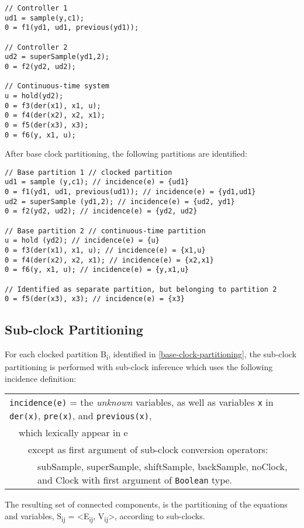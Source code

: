 \begin{example}
\begin{lstlisting}[language=modelica]
// Controller 1
ud1 = sample(y,c1);
0 = f1(yd1, ud1, previous(yd1));

// Controller 2
ud2 = superSample(yd1,2);
0 = f2(yd2, ud2);

// Continuous-time system
u = hold(yd2);
0 = f3(der(x1), x1, u);
0 = f4(der(x2), x2, x1);
0 = f5(der(x3), x3);
0 = f6(y, x1, u);
\end{lstlisting}

After base clock partitioning, the following partitions are identified:
\begin{lstlisting}[language=modelica]
// Base partition 1 // clocked partition
ud1 = sample (y,c1); // incidence(e) = {ud1}
0 = f1(yd1, ud1, previous(ud1)); // incidence(e) = {yd1,ud1}
ud2 = superSample (yd1,2); // incidence(e) = {ud2, yd1}
0 = f2(yd2, ud2); // incidence(e) = {yd2, ud2}

// Base partition 2 // continuous-time partition
u = hold (yd2); // incidence(e) = {u}
0 = f3(der(x1), x1, u); // incidence(e) = {x1,u}
0 = f4(der(x2), x2, x1); // incidence(e) = {x2,x1}
0 = f6(y, x1, u); // incidence(e) = {y,x1,u}

// Identified as separate partition, but belonging to partition 2
0 = f5(der(x3), x3); // incidence(e) = {x3}
\end{lstlisting}
\end{example}

\subsection{Sub-clock Partitioning}\label{sub-clock-partitioning}

For each clocked partition B\textsubscript{i}, identified in
\cref{base-clock-partitioning}, the sub-clock partitioning is performed with sub-clock inference
which uses the following incidence definition:

\begin{tabular}{p{1cm}p{1cm}p{1cm}p{12cm}}
\multicolumn{4}{p{15cm}}{\lstinline!incidence(e)! = the \emph{unknown} variables, as well as
variables \lstinline!x! in \lstinline!der(x)!, \lstinline!pre(x)!, and \lstinline!previous(x)!,}\\
&\multicolumn{3}{p{14cm}}{which lexically appear in e}\\
&&\multicolumn{2}{p{13cm}}{except as first argument of sub-clock conversion operators:}\\
&&&\multicolumn{1}{p{12cm}}{subSample, superSample, shiftSample, backSample, noClock, and Clock with first argument of \lstinline!Boolean! type.}
\end{tabular}
The resulting set of connected components, is the partitioning of the
equations and variables, S\textsubscript{ij} =
\textless{}E\textsubscript{ij}, V\textsubscript{ij}\textgreater{},
according to sub-clocks.

